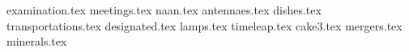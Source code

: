 \documentclass[11pt,a4paper,oneside,arabic,korean]{article}
\begin{document}
	


	{examination.tex}
	{meetings.tex}
	{naan.tex}
	{antennaes.tex}
	{dishes.tex}
	{transportations.tex}
	{designated.tex}
	{lamps.tex}
	{timeleap.tex}
	{cake3.tex}
	{mergers.tex}
	{minerals.tex}
\end{document}
